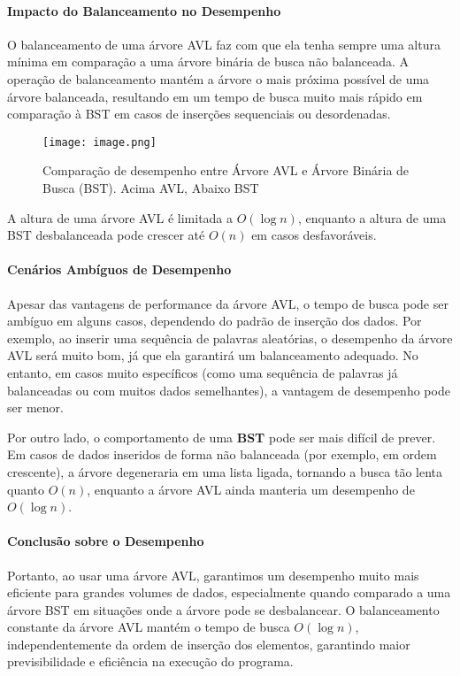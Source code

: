 \documentclass{article}
\begin{document}
\paragraph{Impacto do Balanceamento no Desempenho}
O balanceamento de uma árvore AVL faz com que ela tenha sempre uma altura mínima em comparação a uma árvore binária de busca não balanceada. A operação de balanceamento mantém a árvore o mais próxima possível de uma árvore balanceada, resultando em um tempo de busca muito mais rápido em comparação à BST em casos de inserções sequenciais ou desordenadas.

\begin{figure}[h!]
    \centering
    \texttt{[image: image.png]}
    \caption{Comparação de desempenho entre Árvore AVL e Árvore Binária de Busca (BST). Acima AVL, Abaixo BST}
    \label{fig:enter-label}
\end{figure}

A altura de uma árvore AVL é limitada a \(O(\log n)\), enquanto a altura de uma BST desbalanceada pode crescer até \(O(n)\) em casos desfavoráveis.

\paragraph{Cenários Ambíguos de Desempenho}
Apesar das vantagens de performance da árvore AVL, o tempo de busca pode ser ambíguo em alguns casos, dependendo do padrão de inserção dos dados. Por exemplo, ao inserir uma sequência de palavras aleatórias, o desempenho da árvore AVL será muito bom, já que ela garantirá um balanceamento adequado. No entanto, em casos muito específicos (como uma sequência de palavras já balanceadas ou com muitos dados semelhantes), a vantagem de desempenho pode ser menor. 

Por outro lado, o comportamento de uma \textbf{BST} pode ser mais difícil de prever. Em casos de dados inseridos de forma não balanceada (por exemplo, em ordem crescente), a árvore degeneraria em uma lista ligada, tornando a busca tão lenta quanto \(O(n)\), enquanto a árvore AVL ainda manteria um desempenho de \(O(\log n)\).

\paragraph{Conclusão sobre o Desempenho}
Portanto, ao usar uma árvore AVL, garantimos um desempenho muito mais eficiente para grandes volumes de dados, especialmente quando comparado a uma árvore BST em situações onde a árvore pode se desbalancear. O balanceamento constante da árvore AVL mantém o tempo de busca \(O(\log n)\), independentemente da ordem de inserção dos elementos, garantindo maior previsibilidade e eficiência na execução do programa.
\end{document}
